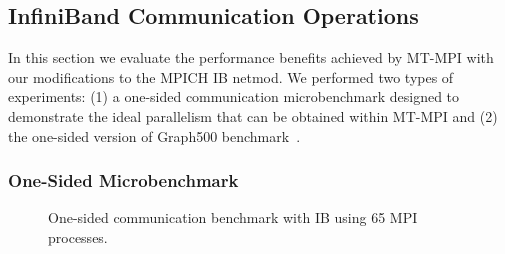 \subsection{InfiniBand Communication Operations}\label{sec:eva-netmod}

In this section we evaluate the performance benefits achiev\-ed by
MT-MPI with our modifications to the MPICH IB netmod.  We performed two
types of experiments: (1) a one-sided communication microbenchmark
designed to demonstrate the ideal parallelism that can be obtained
within MT-MPI and (2) the one-sided version of Graph500
benchmark~\cite{graph500}.

\subsubsection{One-Sided Microbenchmark}
\label{sec:one-sided-bench}

\begin{figure}
\centering
{}
\vspace{-2.0ex}
\caption{One-sided communication benchmark with IB using 65 MPI processes.}
\vspace{-3.0ex}
\label{fig:eva-ib-micro}
\end{figure}

